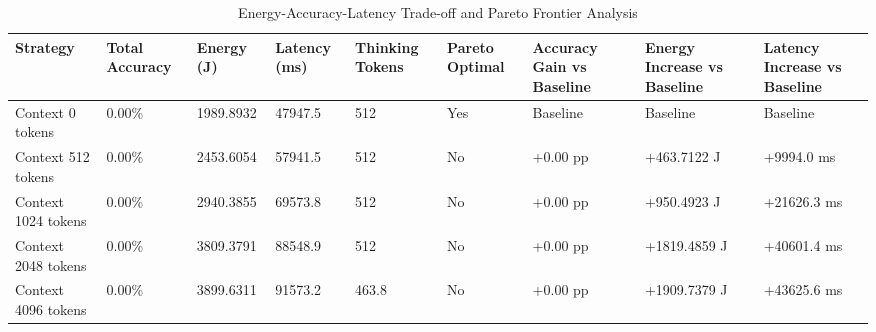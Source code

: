 \begin{table}
\caption{Energy-Accuracy-Latency Trade-off and Pareto Frontier Analysis}
\label{tab:tradeoff_comparison}
\begin{tabular}{lllllllll}
\toprule
Strategy & Total Accuracy & Energy (J) & Latency (ms) & Thinking Tokens & Pareto Optimal & Accuracy Gain vs Baseline & Energy Increase vs Baseline & Latency Increase vs Baseline \\
\midrule
Context 0 tokens & 0.00\% & 1989.8932 & 47947.5 & 512 & Yes & Baseline & Baseline & Baseline \\
Context 512 tokens & 0.00\% & 2453.6054 & 57941.5 & 512 & No & +0.00 pp & +463.7122 J & +9994.0 ms \\
Context 1024 tokens & 0.00\% & 2940.3855 & 69573.8 & 512 & No & +0.00 pp & +950.4923 J & +21626.3 ms \\
Context 2048 tokens & 0.00\% & 3809.3791 & 88548.9 & 512 & No & +0.00 pp & +1819.4859 J & +40601.4 ms \\
Context 4096 tokens & 0.00\% & 3899.6311 & 91573.2 & 463.8 & No & +0.00 pp & +1909.7379 J & +43625.6 ms \\
\bottomrule
\end{tabular}
\end{table}
